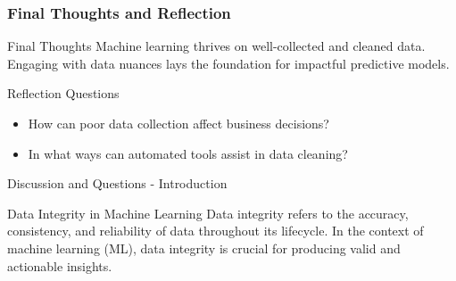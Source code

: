 \documentclass[aspectratio=169]{beamer}
\begin{document}
\begin{frame}[fragile]
    \frametitle{Final Thoughts and Reflection}
    \begin{block}{Final Thoughts}
        Machine learning thrives on well-collected and cleaned data. Engaging with data nuances lays the foundation for impactful predictive models.
    \end{block}

    \begin{block}{Reflection Questions}
        \begin{itemize}
            \item How can poor data collection affect business decisions?
            \item In what ways can automated tools assist in data cleaning?
        \end{itemize}
    \end{block}
\end{frame}

\begin{frame}[fragile]{Discussion and Questions - Introduction}
    \begin{block}{Data Integrity in Machine Learning}
        Data integrity refers to the accuracy, consistency, and reliability of data throughout its lifecycle. 
        In the context of machine learning (ML), data integrity is crucial for producing valid and actionable insights.
    \end{block}
\end{frame}
\end{document}
